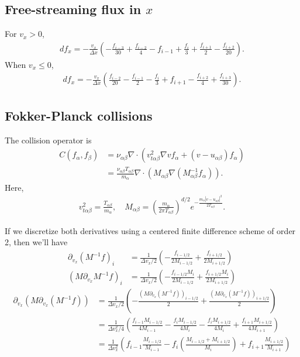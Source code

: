 \documentclass{article}
\begin{document}
\subsection{Free-streaming flux in $x$}

For $v_x > 0$,
\begin{align*}
df_x = -\frac{v_x}{\Delta x}\left( -\frac{f_{i-3}}{30} + \frac{f_{i-2}}{4} - f_{i-1} + \frac{f_{i}}{3} + \frac{f_{i+1}}{2} - \frac{f_{i+2}}{20} \right).
\end{align*}
When $v_x \leq 0$,
\begin{align*}
df_x = -\frac{v_x}{\Delta x}\left( \frac{f_{i-2}}{20} - \frac{f_{i-1}}{2} - \frac{f_{i}}{3} + f_{i+1} - \frac{f_{i+2}}{4} + \frac{f_{i+3}}{30} \right).
\end{align*}

\subsection{Fokker-Planck collisions}
The collision operator is
\begin{align*}
    C(f_\alpha, f_\beta) &= \nu_{\alpha\beta} \nabla \cdot \left( v_{t\alpha\beta}^2 \nabla v f_\alpha + (v - u_{\alpha\beta})f_\alpha \right) \\
                         &= \frac{\nu_{\alpha\beta} T_{\alpha\beta}}{m_\alpha} \nabla \cdot \left( M_{\alpha\beta} \nabla (M_{\alpha\beta}^{-1} f_{\alpha}) \right).
\end{align*}
Here,
\begin{align*}
    v_{t\alpha\beta}^2 = \frac{T_{\alpha\beta}}{m_{\alpha}}, \quad M_{\alpha\beta} = \left( \frac{m_\alpha}{2\pi T_{\alpha\beta}} \right)^{d/2} e^{-\frac{m_\alpha|v - u_{\alpha\beta}|^2}{2T_{\alpha\beta}}}.
\end{align*}

If we discretize both derivatives using a centered finite difference scheme of order 2, then we'll have
\begin{align*}
    \partial_{v_x} (M^{-1}f)_i &= \frac{1}{\Delta v_x / 2} \left( - \frac{f_{i-1/2}}{2M_{i-1/2}} + \frac{f_{i+1/2}}{2M_{i+1/2}}\right)  \\
    (M \partial_{v_x} M^{-1}f)_i &= \frac{1}{\Delta v_x / 2} \left( - \frac{f_{i-1/2}M_i}{2M_{i-1/2}} + \frac{f_{i+1/2}M_i}{2M_{i+1/2}}\right) 
\end{align*}
\begin{align*}
    \partial_{v_x} (M \partial_{v_x}(M^{-1}f)) &= \frac{1}{\Delta v_x/2} \left( - \frac{(M \partial_{v_x}(M^{-1}f))_{i-1/2}}{2} + \frac{(M \partial_{v_x}(M^{-1}f))_{i+1/2}}{2} \right) \\
                                               &= \frac{1}{\Delta v_x^2/4} \left( \frac{f_{i-1} M_{i-1/2}}{4M_{i-1}} - \frac{f_i M_{i-1/2}}{4M_i} - \frac{f_i M_{i+1/2}}{4M_i} + \frac{f_{i+1} M_{i+1/2}}{4M_{i+1}} \right) \\
                                               &= \frac{1}{\Delta v_x^2} \left( f_{i-1} \frac{M_{i-1/2}}{M_{i-1}} - f_i \left( \frac{M_{i-1/2} + M_{i+1/2}}{M_i} \right) + f_{i+1} \frac{M_{i+1/2}}{M_{i+1}} \right) 
\end{align*}
\end{document}
